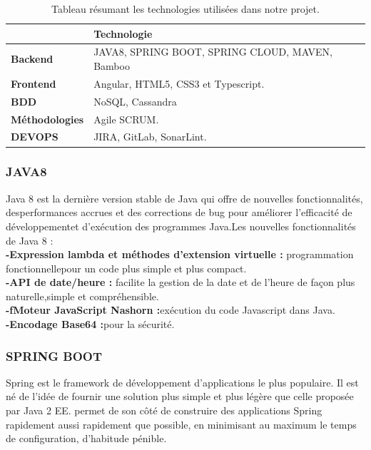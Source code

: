  \begin{table}[H]
    \captionsetup{justification=centering}
    \caption{  \label{tab:UC-ATH} Tableau résumant les technologies utilisées dans notre projet.}
    \centering
    \begin{tabular} {|m{10em}|m{25em}|}
    \hline
    \rowcolor[HTML]{8c9eff} 
    \textbf{ } & \textbf{Technologie} \\
    \hline
    \rowcolor[HTML]{e8eaf6}
    \textbf{Backend} & JAVA8, SPRING BOOT, SPRING CLOUD, MAVEN, Bamboo \\
    \hline
    \rowcolor[HTML]{f3e5f5}
    \textbf{Frontend} & Angular, HTML5, CSS3 et Typescript. \\
    \hline
    \rowcolor[HTML]{e8eaf6}
    \textbf{BDD} & NoSQL, Cassandra \\ 
    \hline
    \rowcolor[HTML]{f3e5f5}
    \textbf{Méthodologies} & Agile SCRUM. \\ 
    \hline
    \rowcolor[HTML]{e8eaf6}
    \textbf{DEVOPS} & JIRA, GitLab, SonarLint.\\
    \hline
    \end{tabular}
    \end{table}
    
    \subsubsection{JAVA8}
    Java 8 est la dernière version stable de Java qui offre de nouvelles fonctionnalités, desperformances accrues et des corrections de bug pour améliorer l’efficacité de développementet d’exécution des programmes Java.Les nouvelles fonctionnalités de Java 8 :\\
    \noindent \textbf{-Expression lambda et méthodes d’extension virtuelle :} programmation fonctionnellepour un code plus simple et plus compact.\\
    \noindent \textbf{-API de date/heure :} facilite la gestion de la date et de l’heure de façon plus naturelle,simple et compréhensible.\\
     \noindent \textbf{-fMoteur JavaScript Nashorn :}exécution du code Javascript dans Java.\\
   \noindent \textbf{-Encodage Base64 :}pour la sécurité.\\
     \subsubsection{SPRING BOOT}
    
    Spring est le framework de développement d’applications le plus populaire. Il est né de l’idée de fournir une solution plus simple et plus légère que celle proposée par Java 2 EE. permet de son côté de construire des applications Spring rapidement aussi rapidement que possible, en minimisant au maximum le temps de configuration, d'habitude
pénible.

